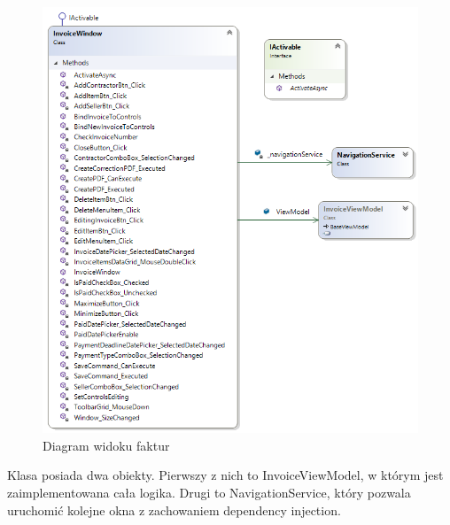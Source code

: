 \begin{figure}[ht!]
\centering
  \includegraphics[width=0.7\linewidth]{Rysunki/InvoiceWindowDiagram.png}
  \caption{Diagram widoku faktur}
  \label{fig:InvoiceWindowDiagram}
\end{figure}

Klasa posiada dwa obiekty. Pierwszy z nich to InvoiceViewModel, w którym jest zaimplementowana cała logika. Drugi to NavigationService, który pozwala uruchomić kolejne okna z zachowaniem dependency injection. 

